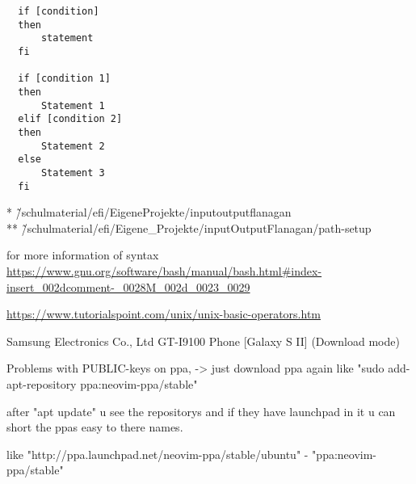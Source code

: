 \documentclass[12pt]{article}
\begin{document}
  \lstset{language=sh}
  \begin{lstlisting} 
  if [condition]
  then
      statement 
  fi

  if [condition 1]
  then 
      Statement 1
  elif [condition 2]
  then
      Statement 2
  else 
      Statement 3
  fi

  \end{lstlisting}

* \~/schulmaterial/efi/EigeneProjekte/inputoutputflanagan \\
** \~/schulmaterial/efi/Eigene\_Projekte/inputOutputFlanagan/path-setup 

for more information of syntax
{\url{https://www.gnu.org/software/bash/manual/bash.html#index-insert_002dcomment-_0028M_002d_0023_0029}}

{\url{https://www.tutorialspoint.com/unix/unix-basic-operators.htm}}

Samsung Electronics Co., Ltd GT-I9100 Phone [Galaxy S II] (Download mode)

Problems with PUBLIC-keys on ppa, -> just download ppa again like "sudo add-apt-repository ppa:neovim-ppa/stable" 

after "apt update" u see the repositorys and if they have launchpad in it u can short the ppas easy to there names. 

like "http://ppa.launchpad.net/neovim-ppa/stable/ubuntu" - "ppa:neovim-ppa/stable"
\end{document}
